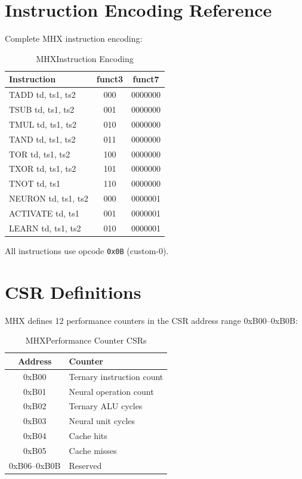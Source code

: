 \documentclass[conference,10pt]{IEEEtran}
\newcommand{\mhx}{\textsc{MHX\texttrademark}}
\begin{document}

\appendix

\section{Instruction Encoding Reference}
\label{app:encoding}

Complete \mhx{} instruction encoding:

\begin{table}[h]
\centering
\caption{MHX\texttrademark Instruction Encoding}
\begin{tabular}{|l|c|c|}
\hline
\textbf{Instruction} & \textbf{funct3} & \textbf{funct7} \\
\hline
TADD td, ts1, ts2 & 000 & 0000000 \\
TSUB td, ts1, ts2 & 001 & 0000000 \\
TMUL td, ts1, ts2 & 010 & 0000000 \\
TAND td, ts1, ts2 & 011 & 0000000 \\
TOR td, ts1, ts2 & 100 & 0000000 \\
TXOR td, ts1, ts2 & 101 & 0000000 \\
TNOT td, ts1 & 110 & 0000000 \\
NEURON td, ts1, ts2 & 000 & 0000001 \\
ACTIVATE td, ts1 & 001 & 0000001 \\
LEARN td, ts1, ts2 & 010 & 0000001 \\
\hline
\end{tabular}
\end{table}

All instructions use opcode \texttt{0x0B} (custom-0).

\section{CSR Definitions}
\label{app:csr}

\mhx{} defines 12 performance counters in the CSR address range 0xB00--0xB0B:

\begin{table}[h]
\centering
\caption{MHX\texttrademark Performance Counter CSRs}
\begin{tabular}{|c|l|}
\hline
\textbf{Address} & \textbf{Counter} \\
\hline
0xB00 & Ternary instruction count \\
0xB01 & Neural operation count \\
0xB02 & Ternary ALU cycles \\
0xB03 & Neural unit cycles \\
0xB04 & Cache hits \\
0xB05 & Cache misses \\
0xB06--0xB0B & Reserved \\
\hline
\end{tabular}
\end{table}
\end{document}
